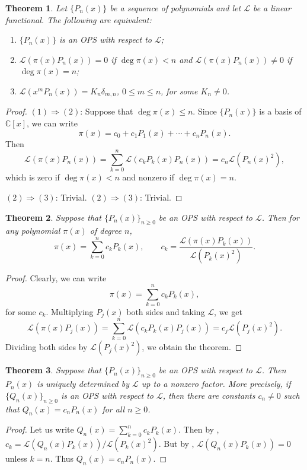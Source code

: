 \documentclass[oneside]{book}
\numberwithin{equation}{section}
\newtheorem{thm}{Theorem}[section]
\theoremstyle{definition}
\newcommand{\CC}{\mathbb{C}}
\newcommand\LL{\mathcal{L}}
\begin{document}
\begin{thm}\label{thm:orth-equiv}
  Let \( \{P_n(x) \} \) be a sequence of polynomials and let \( \LL \) be
  a linear functional. The following are equivalent:
  \begin{enumerate}
  \item \( \{P_n(x) \} \) is an OPS with respect to \( \LL \);
  \item \( \LL(\pi(x) P_n(x)) = 0 \) if \( \deg \pi(x) < n \) and
    \( \LL(\pi(x) P_n(x)) \ne 0 \) if \( \deg \pi(x) = n \);
  \item \( \LL(x^m P_n(x)) = K_n \delta_{m,n} \), \( 0\le m\le n \), for some \( K_n\ne 0 \).
  \end{enumerate}
\end{thm}
\begin{proof}
\( (1) \Rightarrow (2) \):
Suppose that \( \deg \pi(x) \le n \).
Since \( \{P_n(x) \} \) is a basis of \( \CC[x] \), we can write
\[
  \pi(x) = c_0 + c_1 P_1(x) + \cdots + c_n P_n(x).
\]
Then
\[
  \LL(\pi(x) P_n(x)) = \sum_{k=0}^n \LL \left( c_k P_k(x) P_n(x) \right)
  = c_n \LL(P_n(x)^2),
\]
which is zero if \( \deg \pi(x) <n \) and nonzero if \( \deg \pi(x) =n \).

\( (2) \Rightarrow (3) \): Trivial.
\( (2) \Rightarrow (3) \): Trivial.
\end{proof}

\begin{thm}\label{thm:orth-coeff}
  Suppose that \( \{ P_n(x) \}_{n\ge 0} \) be an OPS with respect to \( \LL \).
  Then for any polynomial \( \pi(x) \) of degree \( n \),
\[
  \pi(x) = \sum_{k=0}^n  c_k P_k(x), \qquad
  c_k = \frac{\LL(\pi(x)P_k(x))}{\LL(P_k(x)^2)}.
\]
\end{thm}
\begin{proof}
  Clearly, we can write
  \[
    \pi(x) = \sum_{k=0}^n c_k P_k(x),
  \]
  for some \( c_k \). Multiplying \( P_j(x) \) both sides
  and taking \( \LL \), we get
  \[
    \LL(\pi(x) P_j(x)) = \sum_{k=0}^n \LL \left( c_k P_k(x) P_j(x) \right)
    = c_j \LL(P_j(x)^2).
  \]
  Dividing both sides by \( \LL(P_j(x)^2) \), we obtain the theorem.
\end{proof}

\begin{thm}\label{thm:uniqueness-OPS}
  Suppose that \( \{ P_n(x) \}_{n\ge 0} \) be an OPS with respect to
  \( \LL \). Then \( P_n(x) \) is uniquely determined by \( \LL \) up
  to a nonzero factor. More precisely, if \( \{ Q_n(x) \}_{n\ge 0} \)
  is an OPS with respect to \( \LL \), then there are constants
  \( c_n\ne0 \) such that \( Q_n(x) = c_n P_n(x) \) for all
  \( n\ge0 \).
\end{thm}
\begin{proof}
  Let us write \(Q_n(x) = \sum_{k=0}^n c_k P_k(x) \). Then by
  , \( c_k = \LL(Q_n(x)P_k(x))/\LL(P_k(x)^2) \).
  But by , \( \LL(Q_n(x)P_k(x)) = 0 \) unless
  \( k=n \). Thus \( Q_n(x) = c_n P_n(x) \).
\end{proof}
\end{document}
